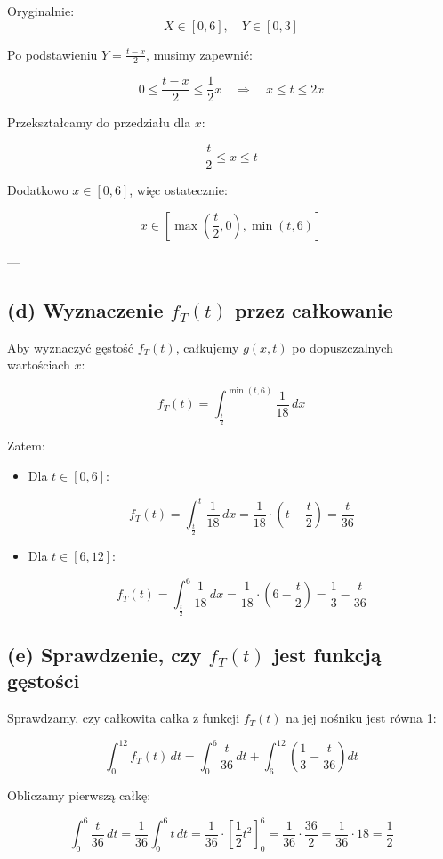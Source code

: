 \documentclass{article}
\begin{document}
Oryginalnie:
\[
X \in [0, 6], \quad Y \in [0, 3]
\]

Po podstawieniu \( Y = \frac{t - x}{2} \), musimy zapewnić:

\[
0 \leq \frac{t - x}{2} \leq \frac{1}{2}x
\quad \Rightarrow \quad x \leq t \leq 2x
\]

Przekształcamy do przedziału dla \( x \):

\[
\frac{t}{2} \leq x \leq t
\]

Dodatkowo \( x \in [0, 6] \), więc ostatecznie:

\[
x \in \left[\max\left(\frac{t}{2}, 0\right), \min(t, 6)\right]
\]

---

\subsection*{(d) Wyznaczenie \( f_T(t) \) przez całkowanie}

Aby wyznaczyć gęstość \( f_T(t) \), całkujemy \( g(x, t) \) po dopuszczalnych wartościach \( x \):

\[
f_T(t) = \int_{\frac{t}{2}}^{\min(t, 6)} \frac{1}{18} \, dx
\]

Zatem:

\begin{itemize}
  \item Dla \( t \in [0, 6] \):

  \[
  f_T(t) = \int_{\frac{t}{2}}^{t} \frac{1}{18} \, dx = \frac{1}{18} \cdot \left(t - \frac{t}{2} \right) = \frac{t}{36}
  \]

  \item Dla \( t \in [6, 12] \):

  \[
  f_T(t) = \int_{\frac{t}{2}}^{6} \frac{1}{18} \, dx = \frac{1}{18} \cdot \left(6 - \frac{t}{2} \right) = \frac{1}{3} - \frac{t}{36}
  \]
\end{itemize}

\subsection*{(e) Sprawdzenie, czy \( f_T(t) \) jest funkcją gęstości}

Sprawdzamy, czy całkowita całka z funkcji \( f_T(t) \) na jej nośniku jest równa 1:

\[
\int_0^{12} f_T(t) \, dt = \int_0^6 \frac{t}{36} \, dt + \int_6^{12} \left( \frac{1}{3} - \frac{t}{36} \right) dt
\]

Obliczamy pierwszą całkę:

\[
\int_0^6 \frac{t}{36} \, dt = \frac{1}{36} \int_0^6 t \, dt = \frac{1}{36} \cdot \left[ \frac{1}{2}t^2 \right]_0^6 = \frac{1}{36} \cdot \frac{36}{2} = \frac{1}{36} \cdot 18 = \frac{1}{2}
\]
\end{document}
